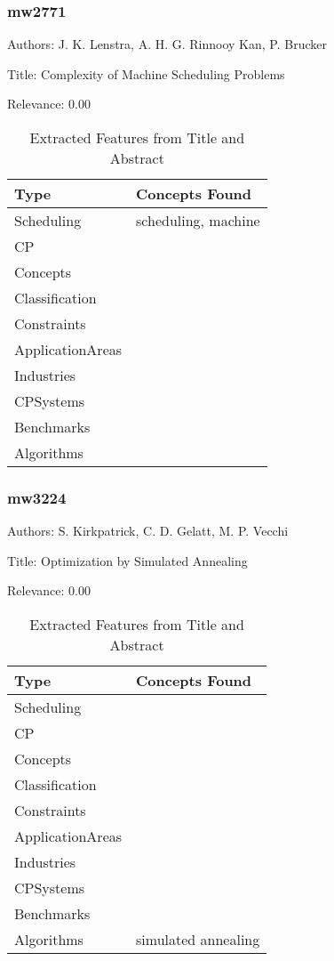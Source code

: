 \subsubsection{mw2771}
\label{mw:mw2771}

Authors: J. K. Lenstra, A. H. G. Rinnooy Kan, P. Brucker

Title: Complexity of Machine Scheduling Problems

Relevance:  0.00

{\scriptsize
\begin{longtable}{p{2cm}p{20cm}}
\caption{Extracted Features from Title and Abstract}\\ \toprule
Type & Concepts Found\\ \midrule
\endhead
\bottomrule
\endfoot
Scheduling & scheduling, machine\\ 
CP & \\ 
Concepts & \\ 
Classification & \\ 
Constraints & \\ 
ApplicationAreas & \\ 
Industries & \\ 
CPSystems & \\ 
Benchmarks & \\ 
Algorithms & \\ 
\end{longtable}
}



\subsubsection{mw3224}
\label{mw:mw3224}

Authors: S. Kirkpatrick, C. D. Gelatt, M. P. Vecchi

Title: Optimization by Simulated Annealing

Relevance:  0.00

{\scriptsize
\begin{longtable}{p{2cm}p{20cm}}
\caption{Extracted Features from Title and Abstract}\\ \toprule
Type & Concepts Found\\ \midrule
\endhead
\bottomrule
\endfoot
Scheduling & \\ 
CP & \\ 
Concepts & \\ 
Classification & \\ 
Constraints & \\ 
ApplicationAreas & \\ 
Industries & \\ 
CPSystems & \\ 
Benchmarks & \\ 
Algorithms & simulated annealing\\ 
\end{longtable}
}

